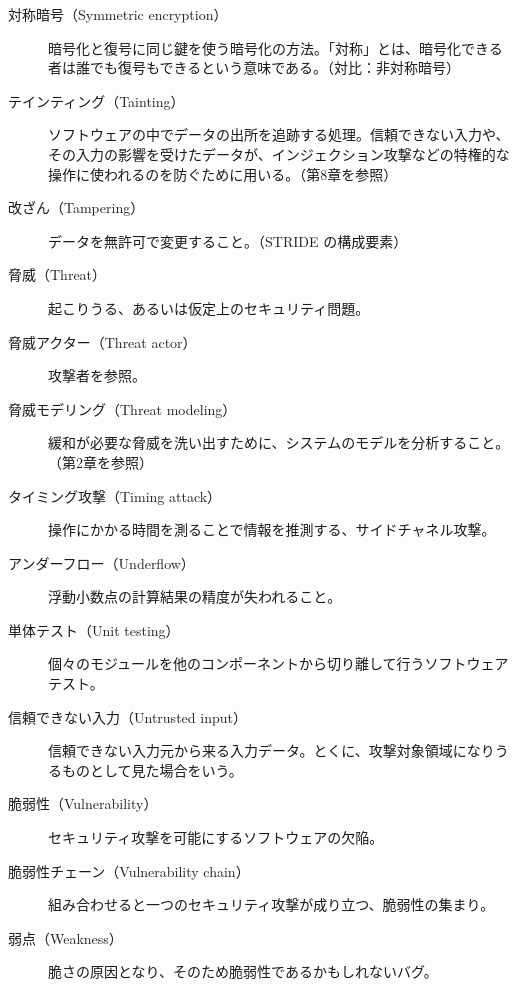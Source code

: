 \documentclass[uplatex]{jsarticle}
\begin{document}
\begin{description}
\item[対称暗号（Symmetric encryption）]
暗号化と復号に同じ鍵を使う暗号化の方法。「対称」とは、暗号化できる者は誰でも復号もできるという意味である。（対比：非対称暗号）

\item[テインティング（Tainting）]
ソフトウェアの中でデータの出所を追跡する処理。信頼できない入力や、その入力の影響を受けたデータが、インジェクション攻撃などの特権的な操作に使われるのを防ぐために用いる。（第8章を参照）

\item[改ざん（Tampering）]
データを無許可で変更すること。（STRIDE の構成要素）

\item[脅威（Threat）]
起こりうる、あるいは仮定上のセキュリティ問題。

\item[脅威アクター（Threat actor）]
攻撃者を参照。

\item[脅威モデリング（Threat modeling）]
緩和が必要な脅威を洗い出すために、システムのモデルを分析すること。（第2章を参照）

\item[タイミング攻撃（Timing attack）]
操作にかかる時間を測ることで情報を推測する、サイドチャネル攻撃。

\item[アンダーフロー（Underflow）]
浮動小数点の計算結果の精度が失われること。

\item[単体テスト（Unit testing）]
個々のモジュールを他のコンポーネントから切り離して行うソフトウェアテスト。

\item[信頼できない入力（Untrusted input）]
信頼できない入力元から来る入力データ。とくに、攻撃対象領域になりうるものとして見た場合をいう。

\item[脆弱性（Vulnerability）]
セキュリティ攻撃を可能にするソフトウェアの欠陥。

\item[脆弱性チェーン（Vulnerability chain）]
組み合わせると一つのセキュリティ攻撃が成り立つ、脆弱性の集まり。

\item[弱点（Weakness）]
脆さの原因となり、そのため脆弱性であるかもしれないバグ。
\end{description}

\newpage

\end{document}
